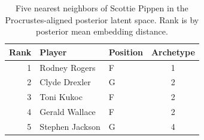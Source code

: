 \begin{table}[htbp]
  \centering\small
  \begin{tabular}{rllc}
    \toprule
    Rank & Player & Position & Archetype \\
    \midrule
    1 & Rodney Rogers & F & 1 \\
    2 & Clyde Drexler & G & 2 \\
    3 & Toni Kukoc & F & 2 \\
    4 & Gerald Wallace & F & 2 \\
    5 & Stephen Jackson & G & 4 \\
    \bottomrule
  \end{tabular}
  \caption{Five nearest neighbors of Scottie Pippen in the Procrustes-aligned posterior latent space. Rank is by posterior mean embedding distance.}
  \label{tab:Scottie_Pippen_neighbors}
\end{table}

